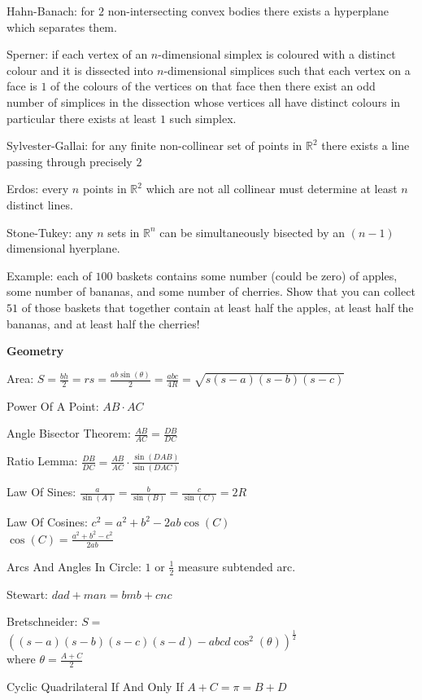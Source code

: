 Hahn-Banach: for $2$ non-intersecting convex bodies there exists a hyperplane which separates them.

Sperner: if each vertex of an $n$-dimensional simplex is coloured with a distinct colour and it is dissected into $n$-dimensional simplices such that each vertex on a face is $1$ of the colours of the vertices on that face then there exist an odd number of simplices in the dissection whose vertices all have distinct colours in particular there exists at least $1$ such simplex.

Sylvester-Gallai: for any finite non-collinear set of points in $\mathbb{R}^2$ there exists a line passing through precisely $2$

Erdos: every $n$ points in $\mathbb{R}^2$ which are not all collinear must determine at least $n$ distinct lines.

Stone-Tukey: any $n$ sets in $\mathbb{R}^n$ can be simultaneously bisected by an $(n-1)$ dimensional hyerplane.

Example: each of $100$ baskets contains some number (could be zero) of apples, some number of bananas, and some number of cherries. Show that you can collect $51$ of those baskets that together contain at least half the apples, at least half the bananas, and at least half the cherries!

\newpage

\textbf{Geometry}

Area: $S=\frac{bh}{2}=rs=\frac{ab\sin(\theta)}{2}=\frac{abc}{4R}=\sqrt{s(s-a)(s-b)(s-c)}$

Power Of A Point: $AB \cdot AC$

Angle Bisector Theorem: $\frac{AB}{AC}=\frac{DB}{DC}$

Ratio Lemma: $\frac{DB}{DC}=\frac{AB}{AC} \cdot \frac{\sin(DAB)}{\sin(DAC)}$

Law Of Sines: $\frac{a}{\sin(A)}=\frac{b}{\sin(B)}=\frac{c}{\sin(C)}=2R$

Law Of Cosines: $c^2=a^2+b^2-2ab\cos(C)$ \\
$\cos(C)=\frac{a^2+b^2-c^2}{2ab}$

Arcs And Angles In Circle: $1$ or $\frac{1}{2}$ measure subtended arc.

Stewart: $dad+man=bmb+cnc$

Bretschneider: $S=$ \\
$((s-a)(s-b)(s-c)(s-d)-abcd \cos^2 (\theta))^{\frac{1}{2}}$ \\
where $\theta = \frac{A+C}{2}$

Cyclic Quadrilateral If And Only If $A+C = \pi = B+D$

